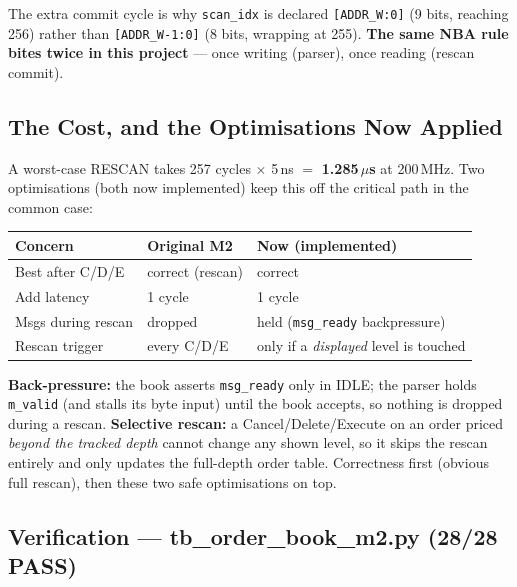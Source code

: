 \documentclass[11pt,a4paper]{article}
\begin{document}
\noindent The extra commit cycle is why \texttt{scan\_idx} is declared
\texttt{[ADDR\_W:0]} (9 bits, reaching 256) rather than \texttt{[ADDR\_W-1:0]}
(8 bits, wrapping at 255). \textbf{The same NBA rule bites twice in this project}
--- once writing (parser), once reading (rescan commit).

\subsection{The Cost, and the Optimisations Now Applied}

A worst-case RESCAN takes 257 cycles $\times$ 5\,ns $=$ \textbf{1.285\,$\mu$s} at
200\,MHz. Two optimisations (both now implemented) keep this off the critical
path in the common case:

\begin{center}
\small
\begin{tabular}{l l l}
\toprule
\textbf{Concern} & \textbf{Original M2} & \textbf{Now (implemented)} \\
\midrule
Best after C/D/E      & \textcolor{fixgreen}{correct (rescan)} & \textcolor{fixgreen}{correct} \\
Add latency           & \textcolor{fixgreen}{1 cycle} & \textcolor{fixgreen}{1 cycle} \\
Msgs during rescan    & \textcolor{sigred}{dropped} & \textcolor{fixgreen}{held (\texttt{msg\_ready} backpressure)} \\
Rescan trigger        & every C/D/E & \textcolor{fixgreen}{only if a \emph{displayed} level is touched} \\
\bottomrule
\end{tabular}
\end{center}

\noindent\textbf{Back-pressure:} the book asserts \texttt{msg\_ready} only in
IDLE; the parser holds \texttt{m\_valid} (and stalls its byte input) until the
book accepts, so nothing is dropped during a rescan. \textbf{Selective rescan:}
a Cancel/Delete/Execute on an order priced \emph{beyond the tracked depth}
cannot change any shown level, so it skips the rescan entirely and only updates
the full-depth order table. Correctness first (obvious full rescan), then these
two safe optimisations on top.

\subsection{Verification --- tb\_order\_book\_m2.py (28/28 PASS)}
\end{document}
